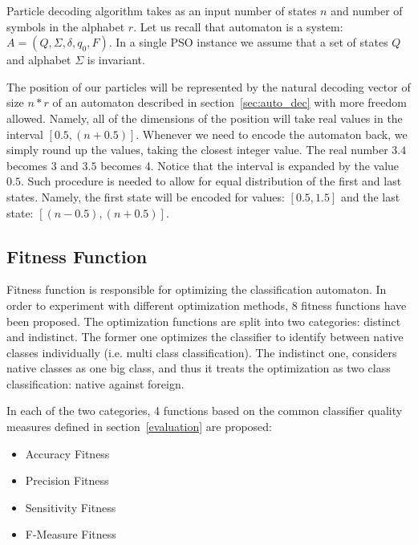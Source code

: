 \documentclass{mini}
\begin{document}
Particle decoding algorithm takes as an input number of states $n$ and number of symbols in the alphabet $r$.
Let us recall that automaton is a system: $A = (Q, \Sigma, \delta, q_0, F)$. In a single PSO instance we assume that a set of states $Q$ and alphabet $\Sigma$ is invariant. 

The position of our particles will be represented by the natural decoding vector of size $n*r$ of an automaton described in section~\ref{sec:auto_dec} with more freedom allowed. Namely, all of the dimensions of the position will take real values in the interval $[0.5, (n+0.5)]$. Whenever we need to encode the automaton back, we simply round up the values, taking the closest integer value. The real number $3.4$ becomes $3$ and $3.5$ becomes 4. Notice that the interval is expanded by the value $0.5$. Such procedure is needed to allow for equal distribution of the first and last states. Namely, the first state will be encoded for values: $[0.5, 1.5]$ and the last state: $[(n-0.5), (n+0.5)]$.

\subsection{Fitness Function}

Fitness function is responsible for optimizing the classification automaton. In order to experiment with different optimization methods, 8 fitness functions have been proposed. The optimization functions are split into two categories: distinct and indistinct. The former one optimizes the classifier to identify between native classes individually (i.e. multi class classification). The indistinct one, considers native classes as one big class, and thus it treats the optimization as two class classification: native against foreign.

In each of the two categories, 4 functions based on the common classifier quality measures defined in section~\ref{evaluation} are proposed:
\begin{itemize}
    \item Accuracy Fitness
    \item Precision Fitness
    \item Sensitivity Fitness
    \item F-Measure Fitness
\end{itemize}
\end{document}
